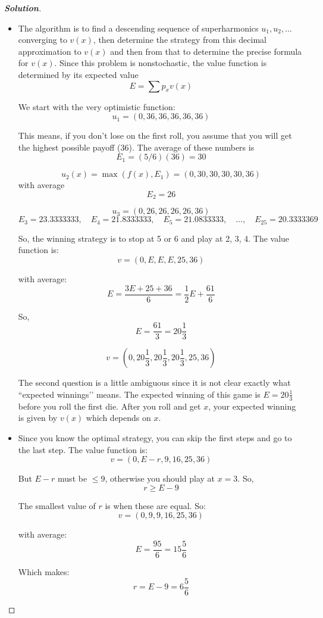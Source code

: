 \documentclass[12pt]{book}
\newenvironment{problem}[2][Problem]{\begin{trivlist}
\item[\hskip \labelsep {\bfseries #1}\hskip \labelsep {\bfseries #2.}]}{\end{trivlist}}
\newenvironment{solution}
               {\let\oldqedsymbol=\qedsymbol
                \renewcommand{\qedsymbol}{$\square$}
                \begin{proof}[\bfseries\upshape Solution]}
               {\end{proof}
                \renewcommand{\qedsymbol}{\oldqedsymbol}}
\begin{document}
\begin{problem}{4.6}
\end{problem}
\begin{solution}
\begin{itemize}
 \item[(a)] 
The algorithm is to find a descending sequence of superharmonics \( u_1, u_2, \ldots \) converging to \( v(x) \), then determine the strategy from this decimal approximation to \( v(x) \) and then from that to determine the precise formula for \( v(x) \). Since this problem is nonstochastic, the value function is determined by its expected value
\[
E = \sum p_x v(x)
\]

We start with the very optimistic function:
\[
u_1 = (0, 36, 36, 36, 36, 36)
\]

This means, if you don’t lose on the first roll, you assume that you will get the highest possible payoff (36). The average of these numbers is
\[
E_1 = (5/6)(36) = 30
\]

\[
u_2(x) = \max(f(x), E_1) = (0, 30, 30, 30, 30, 36)
\]
with average
\[
E_2 = 26
\]

\[
u_3 = (0, 26, 26, 26, 26, 36)
\]
\[
E_3 = 23.3333333, \quad
E_4 = 21.8333333, \quad
E_5 = 21.0833333, \quad
\ldots, \quad
E_{25} = 20.3333369
\]

So, the winning strategy is to stop at 5 or 6 and play at 2, 3, 4. The value function is:
\[
v = (0, E, E, E, 25, 36)
\]

with average:
\[
E = \frac{3E + 25 + 36}{6} = \frac{1}{2}E + \frac{61}{6}
\]

So,
\[
E = \frac{61}{3} = 20\frac{1}{3}
\]

\[
v = (0, 20\frac{1}{3}, 20\frac{1}{3}, 20\frac{1}{3}, 25, 36)
\]

The second question is a little ambiguous since it is not clear exactly what ``expected winnings’’ means. The expected winning of this game is \( E = 20\frac{1}{3} \) before you roll the first die. After you roll and get \( x \), your expected winning is given by \( v(x) \) which depends on \( x \).

 \item[(b)] 
Since you know the optimal strategy, you can skip the first steps and go to the last step. The value function is:
\[
v = (0, E - r, 9, 16, 25, 36)
\]

But \( E - r \) must be \( \leq 9 \), otherwise you should play at \( x = 3 \). So,
\[
r \geq E - 9
\]

The smallest value of \( r \) is when these are equal. So:
\[
v = (0, 9, 9, 16, 25, 36)
\]

with average:
\[
E = \frac{95}{6} = 15\frac{5}{6}
\]

Which makes:
\[
r = E - 9 = 6\frac{5}{6}
\]
\end{itemize}
\end{solution}
\end{document}
